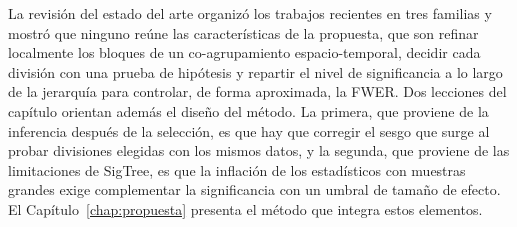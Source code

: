 La revisión del estado del arte organizó los trabajos recientes en tres familias
y mostró que ninguno reúne las características de la propuesta, que son refinar
localmente los bloques de un co-agrupamiento espacio-temporal, decidir cada
división con una prueba de hipótesis y repartir el nivel de significancia a lo
largo de la jerarquía para controlar, de forma aproximada, la \ac{FWER}. Dos
lecciones del capítulo orientan además el diseño del método. La primera, que
proviene de la inferencia después de la selección, es que hay que corregir el
sesgo que surge al probar divisiones elegidas con los mismos datos, y la segunda,
que proviene de las limitaciones de SigTree, es que la inflación de los
estadísticos con muestras grandes exige complementar la significancia con un
umbral de tamaño de efecto. El Capítulo~\ref{chap:propuesta} presenta el método
que integra estos elementos.
